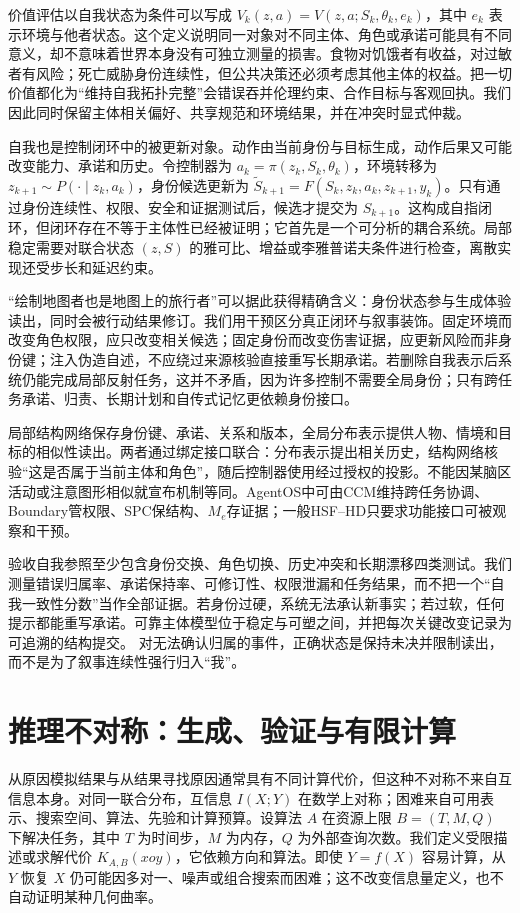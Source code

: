 价值评估以自我状态为条件可以写成 $V_k(z,a)=V(z,a;S_k,\theta_k,e_k)$，其中 $e_k$ 表示环境与他者状态。这个定义说明同一对象对不同主体、角色或承诺可能具有不同意义，却不意味着世界本身没有可独立测量的损害。食物对饥饿者有收益，对过敏者有风险；死亡威胁身份连续性，但公共决策还必须考虑其他主体的权益。把一切价值都化为“维持自我拓扑完整”会错误吞并伦理约束、合作目标与客观回执。我们因此同时保留主体相关偏好、共享规范和环境结果，并在冲突时显式仲裁。

自我也是控制闭环中的被更新对象。动作由当前身份与目标生成，动作后果又可能改变能力、承诺和历史。令控制器为 $a_k=\pi(z_k,S_k,\theta_k)$，环境转移为 $z_{k+1}\sim P(\cdot\mid z_k,a_k)$，身份候选更新为 $\tilde S_{k+1}=F(S_k,z_k,a_k,z_{k+1},y_k)$。只有通过身份连续性、权限、安全和证据测试后，候选才提交为 $S_{k+1}$。这构成自指闭环，但闭环存在不等于主体性已经被证明；它首先是一个可分析的耦合系统。局部稳定需要对联合状态 $(z,S)$ 的雅可比、增益或李雅普诺夫条件进行检查，离散实现还受步长和延迟约束。

“绘制地图者也是地图上的旅行者”可以据此获得精确含义：身份状态参与生成体验读出，同时会被行动结果修订。我们用干预区分真正闭环与叙事装饰。固定环境而改变角色权限，应只改变相关候选；固定身份而改变伤害证据，应更新风险而非身份键；注入伪造自述，不应绕过来源核验直接重写长期承诺。若删除自我表示后系统仍能完成局部反射任务，这并不矛盾，因为许多控制不需要全局身份；只有跨任务承诺、归责、长期计划和自传式记忆更依赖身份接口。

局部结构网络保存身份键、承诺、关系和版本，全局分布表示提供人物、情境和目标的相似性读出。两者通过绑定接口联合：分布表示提出相关历史，结构网络核验“这是否属于当前主体和角色”，随后控制器使用经过授权的投影。不能因某脑区活动或注意图形相似就宣布机制等同。AgentOS中可由CCM维持跨任务协调、Boundary管权限、SPC保结构、$M_e$存证据；一般HSF--HD只要求功能接口可被观察和干预。

验收自我参照至少包含身份交换、角色切换、历史冲突和长期漂移四类测试。我们测量错误归属率、承诺保持率、可修订性、权限泄漏和任务结果，而不把一个“自我一致性分数”当作全部证据。若身份过硬，系统无法承认新事实；若过软，任何提示都能重写承诺。可靠主体模型位于稳定与可塑之间，并把每次关键改变记录为可追溯的结构提交。
对无法确认归属的事件，正确状态是保持未决并限制读出，而不是为了叙事连续性强行归入“我”。

\section{推理不对称：生成、验证与有限计算}
\label{sec:section_677}
从原因模拟结果与从结果寻找原因通常具有不同计算代价，但这种不对称不来自互信息本身。对同一联合分布，互信息 $I(X;Y)$ 在数学上对称；困难来自可用表示、搜索空间、算法、先验和计算预算。设算法 $A$ 在资源上限 $B=(T,M,Q)$ 下解决任务，其中 $T$ 为时间步，$M$ 为内存，$Q$ 为外部查询次数。我们定义受限描述或求解代价 $K_{A,B}(x\!	o\!y)$，它依赖方向和算法。即使 $Y=f(X)$ 容易计算，从 $Y$ 恢复 $X$ 仍可能因多对一、噪声或组合搜索而困难；这不改变信息量定义，也不自动证明某种几何曲率。

